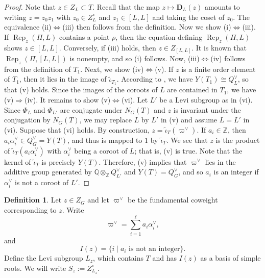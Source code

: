 \documentclass[11pt,oneside,dvipsnames]{amsart}
\theoremstyle{plain}
\theoremstyle{definition}
\newtheorem{Defn}[Thm]{Definition}
\theoremstyle{named}
\DeclareMathOperator{\Rep}{Rep}
\begin{document}
\begin{proof}
Note that $z\in Z_L\subset T$. Recall that the map $z\mapsto\mathbf{D}_L(z)$ amounts to writing $z=z_0z_1$ with $z_0\in Z_L^{\circ}$ and $z_1\in [L,L]$ and taking the coset of $z_0$. The equivalence (ii)$\Leftrightarrow$(iii) then follows from the definition. Now we show (i)$\Leftrightarrow$(iii). If $\Rep_z(\Pi,L)$ contains a point $\rho$, then the equation defining $\Rep_z(\Pi,L)$ shows $z\in[L,L]$. Conversely, if (iii) holds, then $z\in Z_{[L,L]}$. It is known that $\Rep_z(\Pi,[L,L])$ is nonempty, and so (i) follows. Now, (iii)$\Leftrightarrow$(iv) follows from the definition of $T_1$. Next, we show (iv)$\Leftrightarrow$(v). If $z$ is a finite order element of $T_1$, then it lies in the image of $\tilde{\iota}_{T_1}$. According to \cite[Proposition 12.14]{MT}, we have $Y(T_1)\cong Q_L^{\vee}$, so that (v) holds. Since the images of the coroots of $L$ are contained in $T_1$, we have (v)$\Rightarrow$(iv). It remains to show (v)$\Leftrightarrow$(vi). Let $L'$ be a Levi subgroup as in (vi). Since $\Phi_L$ and $\Phi_{L'}$ are conjugate under $N_G(T)$ and $z$ is invariant under the conjugation by $N_G(T)$, we may replace $L$ by $L'$ in (v) and assume $L=L'$ in (vi). Suppose that (vi) holds. By construction, $z=\tilde{\iota}_T(\varpi^{\vee})$. If $a_i\in\mathbb{Z}$, then $a_i\alpha_i^{\vee}\in Q_G^{\vee}=Y(T)$, and thus is mapped to $1$ by $\tilde{\iota}_T$. We see that $z$ is the product of $\tilde{\iota}_T(a_i\alpha_i^{\vee})$ with $\alpha_i^{\vee}$ being a coroot of $L$; that is, (v) is true. Note that the kernel of $\tilde{\iota}_T$ is precisely $Y(T)$. Therefore, (v) implies that $\varpi^{\vee}$ lies in the additive group generated by $\mathbb{Q}\otimes_{\mathbb{Z}}Q_{L'}^{\vee}$ and $Y(T)=Q_G^{\vee}$, and so $a_i$ is an integer if $\alpha_i^{\vee}$ is not a coroot of $L'$.
\end{proof}

\begin{Defn}\label{Defn-Lz}
Let $z\in Z_G$ and let $\varpi^{\vee}$ be the fundamental coweight corresponding to $z$. Write 
$$
\varpi^{\vee}=\sum_{i=1}^{\ell}a_i\alpha_i^{\vee},
$$
and
$$
I(z)=\{i\mid \text{$a_i$ is not an integer}\}.
$$
Define the Levi subgroup $L_z$, which contains $T$ and has $I(z)$ as a basis of simple roots. We will write $S_z:=Z_{L_z}^{\circ}$.
\end{Defn}
\end{document}
